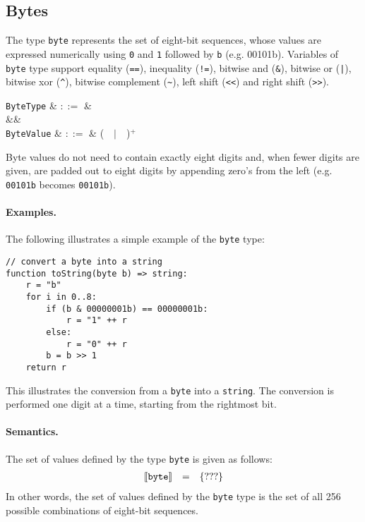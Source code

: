 
\subsection{Bytes}

The type \lstinline{byte} represents the set of eight-bit sequences, whose values are expressed numerically using \lstinline{0} and \lstinline{1} followed by \lstinline{b} (e.g. 00101b).  Variables of \lstinline{byte} type support equality (\lstinline{==}), inequality (\lstinline{!=}), bitwise and (\lstinline{&}), bitwise or (\lstinline{|}), bitwise xor (\lstinline{^}), bitwise complement (\lstinline{~}), left shift (\lstinline{<<}) and right shift (\lstinline{>>}).

\begin{syntax}
 \verb+ByteType+ & $::=$ & \\
 &&\\
 \verb+ByteValue+ & $::=$ & \big(\ \ $|$\ \ \big)$^+$\ \\
\end{syntax}

Byte values do not need to contain exactly eight digits and, when fewer digits are given, are padded out to eight digits by appending zero's from the left (e.g. \lstinline{00101b} becomes \lstinline{00101b}).

\paragraph{Examples.}  The following illustrates a simple example of the \lstinline{byte} type:

\begin{lstlisting}
// convert a byte into a string
function toString(byte b) => string:
    r = "b"
    for i in 0..8:
        if (b & 00000001b) == 00000001b:
            r = "1" ++ r
        else:
            r = "0" ++ r
        b = b >> 1	
    return r
\end{lstlisting}
This illustrates the conversion from a \lstinline{byte} into a \lstinline{string}.  The conversion is performed one digit at a time, starting from the rightmost bit.

\paragraph{Semantics.}  The set of values defined by the type \lstinline{byte} is given as follows:
\begin{displaymath}
\begin{array}{rcl}
\llbracket{\tt byte}\rrbracket & = & \{???\}\\
\end{array}
\end{displaymath}
In other words, the set of values defined by the \lstinline{byte} type is the set of all 256 possible combinations of eight-bit sequences.

